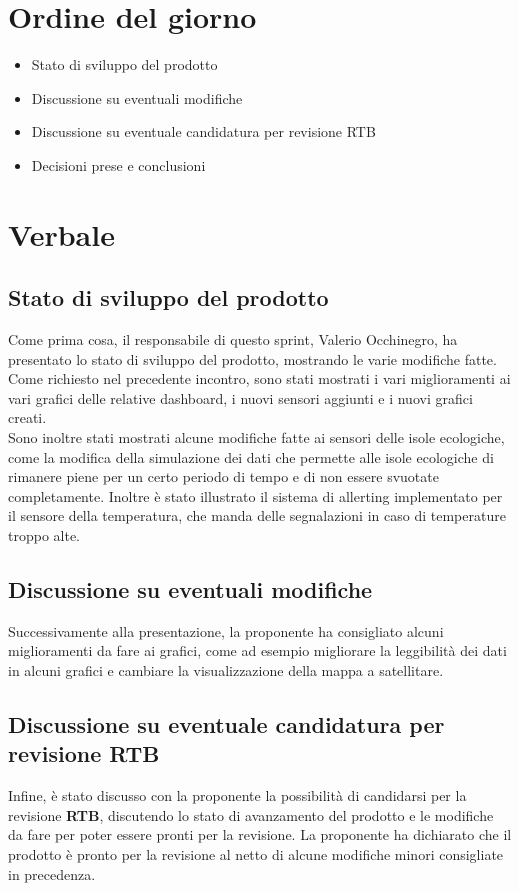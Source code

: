 \documentclass[italian,12pt]{article}
\begin{document}
\section{Ordine del giorno}
\begin{itemize}
	\item Stato di sviluppo del prodotto
	\item Discussione su eventuali modifiche
	\item Discussione su eventuale candidatura per revisione RTB
	\item Decisioni prese e conclusioni
\end{itemize}

\newpage

\section{Verbale}

\subsection{Stato di sviluppo del prodotto}
Come prima cosa, il responsabile di questo sprint, Valerio Occhinegro, ha presentato lo stato di sviluppo del prodotto,
mostrando le varie modifiche fatte. Come richiesto nel precedente incontro, sono stati mostrati i vari miglioramenti
ai vari grafici delle relative dashboard, i nuovi sensori aggiunti e i nuovi grafici creati.\\
Sono inoltre stati mostrati alcune modifiche fatte ai sensori delle isole ecologiche, come la modifica della
simulazione dei dati che permette alle isole ecologiche di rimanere piene per un certo periodo di tempo e di non essere
svuotate completamente. Inoltre è stato illustrato il sistema di allerting implementato per il sensore della
temperatura, che manda delle segnalazioni in caso di temperature troppo alte.\\

\subsection{Discussione su eventuali modifiche}
Successivamente alla presentazione, la proponente ha consigliato alcuni miglioramenti da fare ai grafici, come ad
esempio migliorare la leggibilità dei dati in alcuni grafici e cambiare la visualizzazione della mappa a satellitare.\\

\subsection{Discussione su eventuale candidatura per revisione RTB}
Infine, è stato discusso con la proponente la possibilità di candidarsi per la revisione \textbf{RTB}, discutendo lo
stato di avanzamento del prodotto e le modifiche da fare per poter essere pronti per la revisione. La proponente ha
dichiarato che il prodotto è pronto per la revisione al netto di alcune modifiche minori consigliate in precedenza.\\
\end{document}
